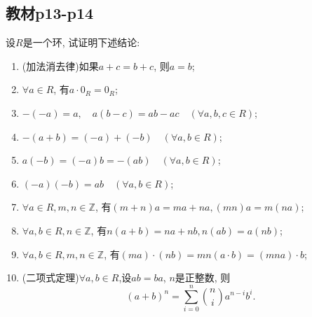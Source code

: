 \subsection{教材p13-p14}

\begin{problem}\label{ex:1.2.1}
    设$R$是一个环, 试证明下述结论: 
\begin{enumerate}[(1)]
    \item (加法消去律)\quad 如果$a + c = b + c$, 则$a = b$;
    \item $\forall a\in R$, 有$a \cdot 0_R = 0_R$;
    \item $-(-a) = a,\quad a(b - c) = ab - ac \quad (\forall a, b, c \in R)$;
    \item $-(a + b) = (-a) + (-b) \quad (\forall a, b \in R)$;
    \item $a(-b) = (-a)b = -(ab) \quad (\forall a, b \in R)$;
    \item $(-a)(-b) = ab \quad (\forall a, b \in R)$;
    \item $\forall a \in R, m, n \in \mathbb{Z}$, 有$(m + n)a = ma + na, (mn)a = m(na)$;
    \item $\forall a, b \in R, n \in \mathbb{Z}$, 有$n(a + b) = na + nb, n(ab) = a(nb)$;
    \item $\forall a, b \in R, m, n \in \mathbb{Z}$, 有$(ma) \cdot (nb) = mn(a \cdot b) = (mna) \cdot b$;
    \item (二项式定理)\quad $\forall a, b \in R$,设$ab = ba$, $n$是正整数, 则
    \[
        (a + b)^n = \sum_{i = 0}^n \binom{n}{i} a^{n - i}b^i.
    \]
\end{enumerate}
\end{problem}

